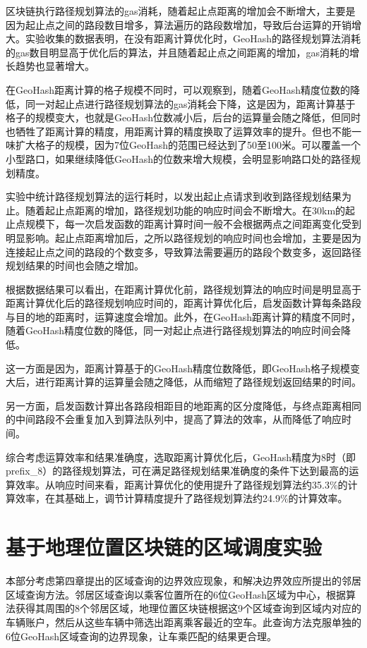 区块链执行路径规划算法的gas消耗，随着起止点距离的增加会不断增大，主要是因为起止点之间的路段数目增多，算法遍历的路段数增加，导致后台运算的开销增大。实验收集的数据表明，在没有距离计算优化时，GeoHash的路径规划算法消耗的gas数目明显高于优化后的算法，并且随着起止点之间距离的增加，gas消耗的增长趋势也显著增大。

​在GeoHash距离计算的格子规模不同时，可以观察到，随着GeoHash精度位数的降低，同一对起止点进行路径规划算法的gas消耗会下降，这是因为，距离计算基于格子的规模变大，也就是GeoHash位数减小后，后台的运算量会随之降低，但同时也牺牲了距离计算的精度，用距离计算的精度换取了运算效率的提升。但也不能一味扩大格子的规模，因为7位GeoHash的范围已经达到了50至100米。可以覆盖一个小型路口，如果继续降低GeoHash的位数来增大规模，会明显影响路口处的路径规划精度。

实验中统计路径规划算法的运行耗时，以发出起止点请求到收到路径规划结果为止。随着起止点距离的增加，路径规划功能的响应时间会不断增大。在30km的起止点规模下，每一次启发函数的距离计算时间一般不会根据两点之间距离变化受到明显影响。起止点距离增加后，之所以路径规划的响应时间也会增加，主要是因为连接起止点之间的路段的个数变多，导致算法需要遍历的路段个数变多，返回路径规划结果的时间也会随之增加。

根据数据结果可以看出，在距离计算优化前，路径规划算法的响应时间是明显高于距离计算优化后的路径规划响应时间的，距离计算优化后，启发函数计算每条路段与目的地的距离时，运算速度会增加。此外，在GeoHash距离计算的精度不同时，随着GeoHash精度位数的降低，同一对起止点进行路径规划算法的响应时间会降低。

这一方面是因为，距离计算基于的GeoHash精度位数降低，即GeoHash格子规模变大后，进行距离计算的运算量会随之降低，从而缩短了路径规划返回结果的时间。

另一方面，启发函数计算出各路段相距目的地距离的区分度降低，与终点距离相同的中间路段不会重复加入到算法队列中，提高了算法的效率，从而降低了响应时间。

综合考虑运算效率和结果准确度，选取距离计算优化后，GeoHash精度为8时（即prefix\_8）的路径规划算法，可在满足路径规划结果准确度的条件下达到最高的运算效率。从响应时间来看，距离计算优化的使用提升了路径规划算法约35.3$\%$的计算效率，在其基础上，调节计算精度提升了路径规划算法约24.9$\%$的计算效率。

\section{基于地理位置区块链的区域调度实验}

本部分考虑第四章提出的区域查询的边界效应现象，和解决边界效应所提出的邻居区域查询方法。邻居区域查询以乘客位置所在的6位GeoHash区域为中心，根据算法获得其周围的8个邻居区域，地理位置区块链根据这9个区域查询到区域内对应的车辆账户，然后从这些车辆中筛选出距离乘客最近的空车。此查询方法克服单独的6位GeoHash区域查询的边界现象，让车乘匹配的结果更合理。

